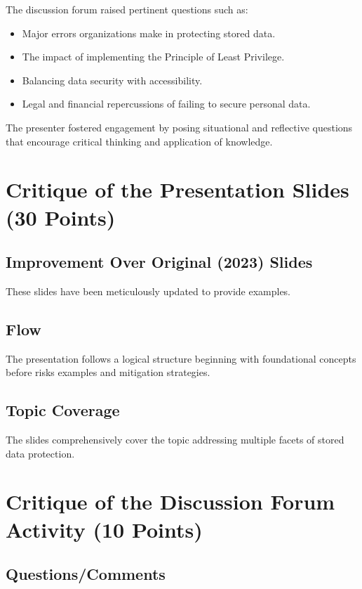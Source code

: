 \documentclass{article}
\begin{document}
The discussion forum raised pertinent questions such as:

\begin{itemize}
    \item Major errors organizations make in protecting stored data.
    \item The impact of implementing the Principle of Least Privilege.
    \item Balancing data security with accessibility.
    \item Legal and financial repercussions of failing to secure personal data.
\end{itemize}

The presenter fostered engagement by posing situational and reflective questions that encourage critical thinking and application of knowledge.

\section*{Critique of the Presentation Slides (30 Points)}

\subsection*{Improvement Over Original (2023) Slides}

These slides have been meticulously updated to provide examples. 

\subsection*{Flow}

The presentation follows a logical structure beginning with foundational concepts before risks examples and mitigation strategies. 

\subsection*{Topic Coverage}

The slides comprehensively cover the topic addressing multiple facets of stored data protection.

\section*{Critique of the Discussion Forum Activity (10 Points)}

\subsection*{Questions/Comments}
\end{document}
